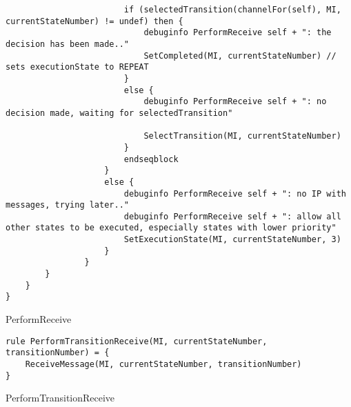 \begin{listing}[H]
\begin{verbatim}
                        if (selectedTransition(channelFor(self), MI, currentStateNumber) != undef) then {
                            debuginfo PerformReceive self + ": the decision has been made.."
                            SetCompleted(MI, currentStateNumber) // sets executionState to REPEAT
                        }
                        else {
                            debuginfo PerformReceive self + ": no decision made, waiting for selectedTransition"

                            SelectTransition(MI, currentStateNumber)
                        }
                        endseqblock
                    }
                    else {
                        debuginfo PerformReceive self + ": no IP with messages, trying later.."
                        debuginfo PerformReceive self + ": allow all other states to be executed, especially states with lower priority"
                        SetExecutionState(MI, currentStateNumber, 3)
                    }
                }
        }
    }
}
\end{verbatim}
\caption{PerformReceive}
\label{lst:asm:PerformReceive}
\end{listing}




\begin{listing}[H]
\begin{verbatim}
rule PerformTransitionReceive(MI, currentStateNumber, transitionNumber) = {
    ReceiveMessage(MI, currentStateNumber, transitionNumber)
}
\end{verbatim}
\caption{PerformTransitionReceive}
\label{lst:asm:PerformTransitionReceive}
\end{listing}




